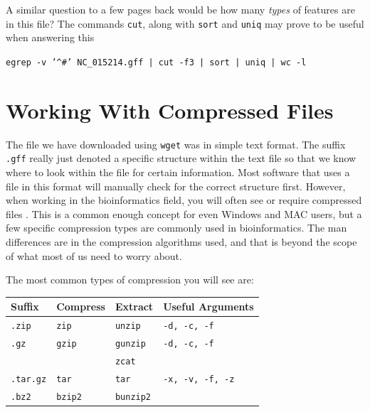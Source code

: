 \documentclass[a4paper,12pt,twoside]{memoir}
\begin{document}
\begin{bonus}
\begin{questions}
A similar question to a few pages back would be how many \textit{types} of features are in this file?
The commands \texttt{cut}, along with \texttt{sort} and \texttt{uniq} may prove to be useful when answering this
\begin{answer}
\texttt{egrep -v '\^{}\#' NC_015214.gff | cut -f3 | sort | uniq | wc -l}
\end{answer}

\end{questions}
\end{bonus}

\section{Working With Compressed Files}

\begin{information}
The file we have downloaded using \texttt{wget} was in simple text format.
The suffix \texttt{.gff} really just denoted a specific structure within the text file so that we know where to look within the file for certain information.
Most software that uses a file in this format will manually check for the correct structure first.
However, when working in the bioinformatics field,  you will often see or require compressed files .
This is a common enough concept for even Windows and MAC users, but a few specific compression types are commonly used in bioinformatics.
The man differences are in the compression algorithms used, and that is beyond the scope of what most of us need to worry about.
\end{information}

The most common types of compression you will see are:\\
\begin{center}
	\begin{tabular}{ p{2cm}  p{3cm}  p{3cm}   p{4cm}}
		\toprule
		\textbf{Suffix} & \textbf{Compress} & \textbf{Extract} & \textbf{Useful Arguments} \\
		\midrule
		\texttt{.zip} & \texttt{zip} & \texttt{unzip} & \texttt{-d, -c, -f} \\
		\midrule
		\texttt{.gz} & \texttt{gzip} & \texttt{gunzip} & \texttt{-d, -c, -f} \\
								 &								& \texttt{zcat} & \\
		\midrule
		\texttt{.tar.gz} & \texttt{tar} & \texttt{tar} & \texttt{-x, -v, -f, -z} \\
		\midrule
		\texttt{.bz2} & \texttt{bzip2} & \texttt{bunzip2} & \\
		\bottomrule
	\end{tabular}
\end{center}
\end{document}
